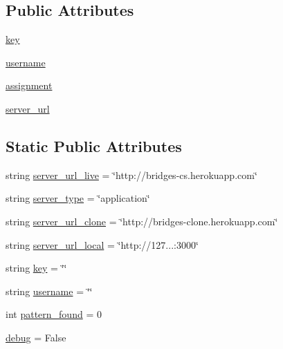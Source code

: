 \subsection*{Public Attributes}
\begin{DoxyCompactItemize}
\item 
\hyperlink{classbridges_1_1connector_1_1_connector_afeae8bc992dfa4336a6cc766d8414e6f}{key}
\item 
\hyperlink{classbridges_1_1connector_1_1_connector_adeb8d1b493eae70c24127fb175e1bfe7}{username}
\item 
\hyperlink{classbridges_1_1connector_1_1_connector_a2df020c062b6224d4eeb2c5407c02656}{assignment}
\item 
\hyperlink{classbridges_1_1connector_1_1_connector_abcc06e345e43916cf975eb200187d911}{server\+\_\+url}
\end{DoxyCompactItemize}
\subsection*{Static Public Attributes}
\begin{DoxyCompactItemize}
\item 
string \hyperlink{classbridges_1_1connector_1_1_connector_a10c26bfaf2718f837e7bddfd7715b729}{server\+\_\+url\+\_\+live} = \char`\"{}http\+://bridges-\/cs.\+herokuapp.\+com\char`\"{}
\item 
string \hyperlink{classbridges_1_1connector_1_1_connector_ab5146d539819322f0b0e121a56356ba2}{server\+\_\+type} = \char`\"{}application\char`\"{}
\item 
string \hyperlink{classbridges_1_1connector_1_1_connector_a9048518314ac4902eda88f8457154b63}{server\+\_\+url\+\_\+clone} = \char`\"{}http\+://bridges-\/clone.\+herokuapp.\+com\char`\"{}
\item 
string \hyperlink{classbridges_1_1connector_1_1_connector_a7d58b50fbd7d10f805957ec620135ef7}{server\+\_\+url\+\_\+local} = \char`\"{}http\+://127...\+:3000\char`\"{}
\item 
string \hyperlink{classbridges_1_1connector_1_1_connector_a3b577c34402fea1910f56fd9cac51c07}{key} = \char`\"{}\char`\"{}
\item 
string \hyperlink{classbridges_1_1connector_1_1_connector_af2f4f996092cf63a5e7940ca93a2c6b7}{username} = \char`\"{}\char`\"{}
\item 
int \hyperlink{classbridges_1_1connector_1_1_connector_ad137981eae887e1f050216edb7670d35}{pattern\+\_\+found} = 0
\item 
\hyperlink{classbridges_1_1connector_1_1_connector_a8210dc126cfe66057cd6c01dcac32a06}{debug} = False
\end{DoxyCompactItemize}


